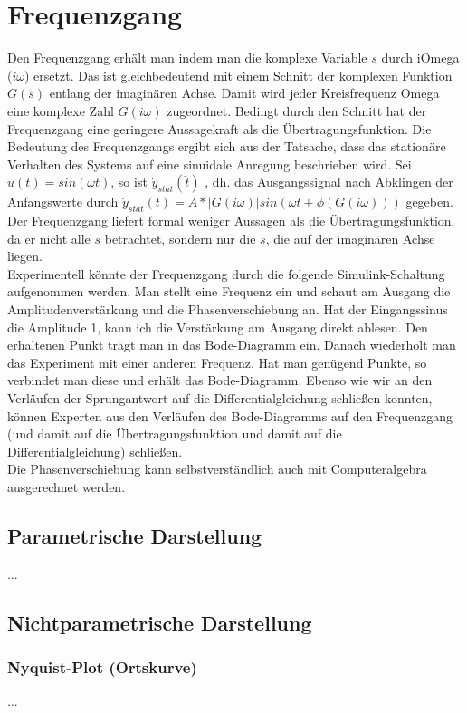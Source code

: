 \documentclass[
  ngerman
  ,12pt
  ,pdftex
]{article}
\begin{document}
\section{Frequenzgang}
Den Frequenzgang erhält man indem man die komplexe Variable $s$ durch iOmega ($i\omega$) ersetzt. Das ist gleichbedeutend mit einem Schnitt der komplexen Funktion $G(s)$ entlang der imaginären Achse. Damit wird jeder Kreisfrequenz Omega eine komplexe Zahl $G(i\omega)$ zugeordnet. Bedingt durch den Schnitt hat der Frequenzgang eine geringere Aussagekraft als die Übertragungsfunktion. Die Bedeutung des Frequenzgangs ergibt sich aus der Tatsache, dass das stationäre Verhalten des Systems auf eine sinuidale Anregung beschrieben wird.
Sei $u(t) = sin(\omega t)$, so ist $\dot{y}_{stat}(\dot{t})$ %
, dh. das Ausgangssignal nach Abklingen der Anfangswerte durch $\dot{y}_{stat}(t)=A*|G(i\omega )|sin(\omega t + \phi (G(i\omega )))$ gegeben. %
Der Frequenzgang liefert formal weniger Aussagen als die Übertragungsfunktion, da er nicht alle $s$ betrachtet, sondern nur die $s$, die auf der imaginären Achse liegen.\\
Experimentell könnte der Frequenzgang durch die folgende Simulink-Schaltung aufgenommen werden. 
Man stellt eine Frequenz ein und schaut am Ausgang die Amplitudenverstärkung und die Phasenverschiebung an. Hat der Eingangssinus die Amplitude 1, kann ich die Verstärkung am Ausgang direkt ablesen. Den erhaltenen Punkt trägt man in das Bode-Diagramm ein. Danach wiederholt man das Experiment mit einer anderen Frequenz. Hat man genügend Punkte, so verbindet man diese und erhält das Bode-Diagramm. Ebenso wie wir an den Verläufen der Sprungantwort auf die Differentialgleichung schließen konnten, können Experten aus den Verläufen des Bode-Diagramms auf den Frequenzgang (und damit auf die Übertragungsfunktion und damit auf die Differentialgleichung) schließen.\\
Die Phasenverschiebung kann selbstverständlich auch mit Computeralgebra ausgerechnet werden.
\subsection{Parametrische Darstellung}
...
\subsection{Nichtparametrische Darstellung}
\subsubsection{Nyquist-Plot (Ortskurve)}
...
\end{document}
